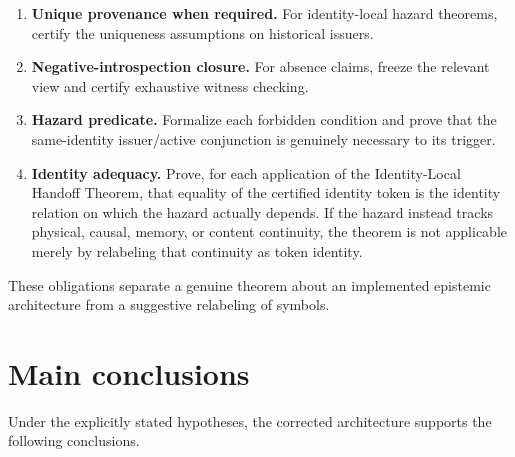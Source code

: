 \documentclass[11pt]{article}
\theoremstyle{remark}
\begin{document}
\begin{enumerate}[label=(O\arabic*)]
\item \textbf{Unique provenance when required.} For identity-local hazard theorems, certify the uniqueness assumptions on historical issuers.
\item \textbf{Negative-introspection closure.} For absence claims, freeze the relevant view and certify exhaustive witness checking.
\item \textbf{Hazard predicate.} Formalize each forbidden condition and prove that the same-identity issuer/active conjunction is genuinely necessary to its trigger.
\item \textbf{Identity adequacy.} Prove, for each application of the Identity-Local Handoff Theorem, that equality of the certified identity token is the identity relation on which the hazard actually depends. If the hazard instead tracks physical, causal, memory, or content continuity, the theorem is not applicable merely by relabeling that continuity as token identity.
\end{enumerate}
These obligations separate a genuine theorem about an implemented epistemic architecture from a suggestive relabeling of symbols.

\section{Main conclusions}

Under the explicitly stated hypotheses, the corrected architecture supports the following conclusions.
\end{document}
